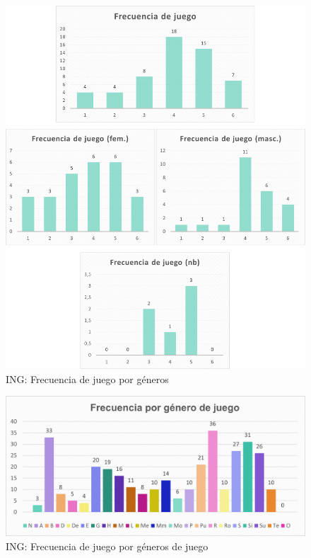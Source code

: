 \documentclass[12pt, a4paper,twoside,titlepage]{book}
\begin{document}
\begin{figure}
    \centering
    \includegraphics[width=1\linewidth]{ANEXO ING/3AnexINGFrec}
    \caption{ING: Frecuencia de juego por géneros}
    \label{fig:INGFrec}
\end{figure}



\begin{figure}
    \centering
    \includegraphics[width=1\linewidth]{ANEXO ING/4AnexINGFrecgen}
    \caption{ING: Frecuencia de juego por géneros de juego}
    \label{fig:INGFrecgen}
\end{figure}
\end{document}
